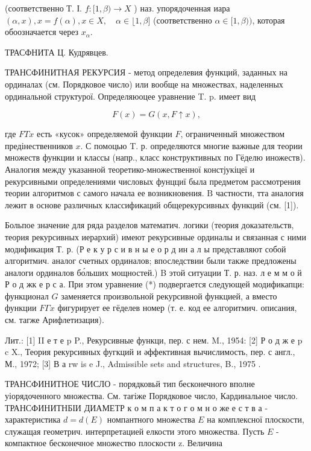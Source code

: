 \documentclass[10pt]{article}
\begin{document}
(соответственно Т. І. $f:[1, \beta) \rightarrow X$ ) наз. упорядоченная иара $(\alpha, x), x=f(\alpha), x \in X, \quad \alpha \in\lfloor 1, \beta]$ (соответственно $\alpha \in[1, \beta))$, которая обоозначается через $x_{\alpha}$.



ТРАСФНИТА Ц. Кудрявцев.



ТРАНСФИНИТНАЯ РЕКУРСИЯ - метод определевия функций, заданных на ординалах (см. Порядковое число) или вообще на множествах, наделенных ординальной структурої. Определяюоцее уравнение T. p. имеет вид



\[

F(x)=G(x, F \uparrow x),

\]



где $F T x$ есть «кусок» определяемой функции $F$, ограниченный множеством предінественников $x$. С помоцью T. р. определяются многие важные для теории множеств функции и классы (напр., класс конструктивных по Гёделю иножеств). Аналогия между указанной теоретико-множественної констјукіцеї и рекурсивными определениями числовых фунцциї была предметом рассмотрения теории алгоритмов с самого начала ее возникновения. $\mathrm{B}$ частности, тта аналогия лежит в основе различных классификаций общерекурсивных функций (см. [1]).



Больпое значение для ряда разделов математич. логики (теория доказательств, теория рекурсивных иерархий) имеют рекурсивные ординалы и связанная с ними модификация Т. р. (Р е к у р с и в н ы е о р д ин а л ы представляют собой алгоритмич. аналог счетных ординалов; впоследствии были также предложены аналоги ординалов бо́льших мощностей.) B этой ситуации Т. р. наз. л е м м о й Р о д жк е р с а. При этом уравнение (*) подвергается следующей модификапци: функционал $G$ заменяется произвольной рекурсивной функцией, а вместо функции $F \Gamma x$ фигурирует ее гёделев номер (т. е. код ее алгоритмич. описания, см. тагже Арифлетизация).



Лит.: [1] II е т е p P., Рекурсивные функци, пер. с нем. M., 1954: [2] Р о д ж е p c X., Теория рекурсивных фугкций и әффективная вычислимость, пер. с англ., М., 1972; [3] В а rw is e J., Admissible sets and structures, B., 1975 .



ТРАНСФИНИТНОЕ ЧИСЛО - порядковьй тип бесконечного вполне уіорядоченного множества. См. тағіже Порядковое число, Кардинальное число. ТРАНСФИНИТНБІИ ДИАМЕТР к $о$ м п а к т о г о м н о же е с т в а - характеристика $d=d(E)$ номпантного множества $E$ на комплексної плоскости, служащая геометрич. интерпретацией елкости этого множества. Пусть $E$ - компактное бесконечное множество плоскости z. Величина
\end{document}
